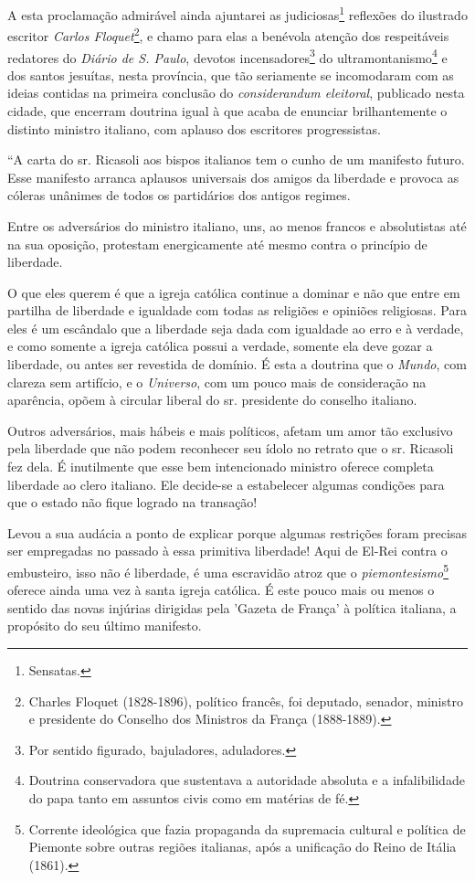 A esta proclamação admirável ainda ajuntarei as judiciosas\footnote{
  Sensatas.} reflexões do ilustrado escritor \emph{Carlos
Floquet}\footnote{Charles Floquet (1828-1896), político francês, foi
  deputado, senador, ministro e presidente do Conselho dos Ministros da
  França (1888-1889).}, e chamo para elas a benévola atenção dos
respeitáveis redatores do \emph{Diário de S. Paulo}, devotos
incensadores\footnote{Por sentido figurado, bajuladores, aduladores.}
do ultramontanismo\footnote{Doutrina conservadora que sustentava a
  autoridade absoluta e a infalibilidade do papa tanto em assuntos civis
  como em matérias de fé.} e dos santos jesuítas, nesta província, que
tão seriamente se incomodaram com as ideias contidas na primeira
conclusão do \emph{considerandum eleitoral}, publicado nesta cidade, que
encerram doutrina igual à que acaba de enunciar brilhantemente o
distinto ministro italiano, com aplauso dos escritores progressistas.

``A carta do sr. Ricasoli aos bispos italianos tem o cunho de um
manifesto futuro. Esse manifesto arranca aplausos universais dos amigos
da liberdade e provoca as cóleras unânimes de todos os partidários dos
antigos regimes.

Entre os adversários do ministro italiano, uns, ao menos francos e
absolutistas até na sua oposição, protestam energicamente até mesmo
contra o princípio de liberdade.

O que eles querem é que a igreja católica continue a dominar e não que
entre em partilha de liberdade e igualdade com todas as religiões e
opiniões religiosas. Para eles é um escândalo que a liberdade seja dada
com igualdade ao erro e à verdade, e como somente a igreja católica
possui a verdade, somente ela deve gozar a liberdade, ou antes ser
revestida de domínio. É esta a doutrina que o \emph{Mundo}, com clareza
sem artifício, e o \emph{Universo}, com um pouco mais de consideração na
aparência, opõem à circular liberal do sr. presidente do conselho
italiano.

Outros adversários, mais hábeis e mais políticos, afetam um amor tão
exclusivo pela liberdade que não podem reconhecer seu ídolo no retrato
que o sr. Ricasoli fez dela. É inutilmente que esse bem intencionado
ministro oferece completa liberdade ao clero italiano. Ele decide-se a
estabelecer algumas condições para que o estado não fique logrado na
transação!

Levou a sua audácia a ponto de explicar porque algumas restrições foram
precisas ser empregadas no passado à essa primitiva liberdade! Aqui de
El-Rei contra o embusteiro, isso não é liberdade, é uma escravidão atroz
que o \emph{piemontesismo}\footnote{Corrente ideológica que fazia
  propaganda da supremacia cultural e política de Piemonte sobre outras
  regiões italianas, após a unificação do Reino de Itália (1861).}
oferece ainda uma vez à santa igreja católica. É este pouco mais ou
menos o sentido das novas injúrias dirigidas pela 'Gazeta de França' à
política italiana, a propósito do seu último manifesto.

